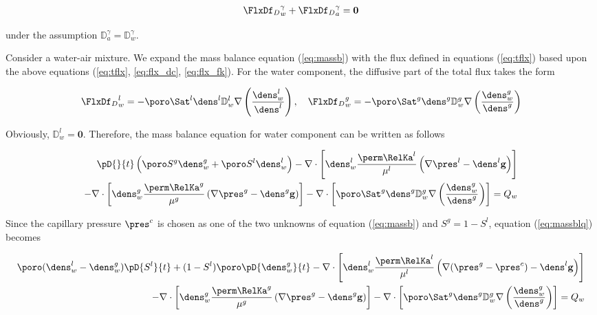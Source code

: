  \begin{align}
{{\FlxDf}_D}_w^{\gamma}+{{\FlxDf}_D}_a^{\gamma}=\mathbf 0
\label{eq:dufblc}
\end{align}

under the assumption ${\mathbb D}_a^{\gamma}  = {\mathbb D}_w^{\gamma} $.

Consider a water-air mixture. We expand the mass balance equation (\ref{eq:massb}) with the flux defined in equations (\ref{eq:tflx}) based upon the above equations (\ref{eq:tflx}, \ref{eq:flx_dc}, \ref{eq:flx_fk}). For the water component, the diffusive part of the total flux takes the form

\begin{align}
{{\FlxDf}_D}_w^{l}=-\poro \Sat^{l}  \dens^{l} {\mathbb D}_w^{l} \nabla \left(\dfrac{\dens_w^{l}}{\dens^{l}}\right),\quad
{{\FlxDf}_D}_w^{g}=-\poro \Sat^{g}  \dens^{g} {\mathbb D}_w^{g} \nabla \left(\dfrac{\dens_w^{g}}{\dens^{g}}\right)
\label{eq:flx_fkw}
\end{align}

Obviously, ${\mathbb D}_w^{l} = \mathbf 0$. Therefore, the mass balance equation for water component can be written as follows

\begin{align}
\pD{}{t} \left(\poro S^g\dens_w^g+\poro S^l\dens_w^l\right)-
\nabla \cdot \left[\dens_w^{l}\dfrac{\perm \RelKa^{l}}{\mu^{l}}\left(\nabla \pres^{l}-\dens^{l} \mathbf g\right)\right]\nonumber\\
-\nabla \cdot \left[\dens_w^{g}\dfrac{\perm \RelKa^{g}}{\mu^{g}}\left(\nabla \pres^{g}-\dens^{g} \mathbf g\right)\right] -
\nabla \cdot \left[\poro \Sat^{g}  \dens^{g} {\mathbb D}_w^{g} \nabla \left(\dfrac{\dens_w^{g}}{\dens^{g}}\right)\right] = Q_w
\label{eq:massblq}
\end{align}

Since the capillary pressure $\pres^c$  is chosen as one of the two unknowns of equation (\ref{eq:massb}) and $S^g=1-S^l$, equation (\ref{eq:massblq}) becomes

\begin{align}
\poro (\dens_w^l -\dens_w^g)\pD{S^l}{t} +(1 -S^l)\poro \pD{\dens_w^{g}}{t} -
\nabla \cdot \left[\dens_w^{l}\dfrac{\perm \RelKa^{l}}{\mu^{l}}\left(\nabla (\pres^{g}-\pres^{c}) -\dens^{l} \mathbf g\right)\right]\nonumber\\
-\nabla \cdot \left[\dens_w^{g}\dfrac{\perm \RelKa^{g}}{\mu^{g}}\left(\nabla \pres^{g}-\dens^{g} \mathbf g\right)\right] -
\nabla \cdot \left[\poro \Sat^{g}  \dens^{g} {\mathbb D}_w^{g} \nabla \left(\dfrac{\dens_w^{g}}{\dens^{g}}\right)\right] = Q_w
\label{eq:msblq}
\end{align}

